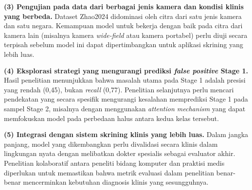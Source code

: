 \textbf{(3) Pengujian pada data dari berbagai jenis kamera dan kondisi klinis yang berbeda.}
Dataset Zhao2024 didominasi oleh citra dari satu jenis kamera dan satu negara. Kemampuan
model untuk bekerja dengan baik pada citra dari kamera lain (misalnya kamera \textit{wide-field} atau
kamera portabel) perlu diuji secara terpisah sebelum model ini dapat dipertimbangkan untuk
aplikasi skrining yang lebih luas.

\textbf{(4) Eksplorasi strategi yang mengurangi prediksi \textit{false positive} Stage 1.} Hasil
penelitian menunjukkan bahwa masalah utama pada Stage 1 adalah presisi yang rendah (0,45),
bukan \textit{recall} (0,77). Penelitian selanjutnya perlu mencari pendekatan yang secara
spesifik mengurangi kesalahan memprediksi Stage 1 pada sampel Stage 2, misalnya dengan
menggunakan \textit{attention mechanism} yang dapat memfokuskan model
pada perbedaan halus antara kedua kelas tersebut.

\textbf{(5) Integrasi dengan sistem skrining klinis yang lebih luas.} Dalam jangka panjang,
model yang dikembangkan perlu divalidasi secara klinis dalam lingkungan nyata dengan melibatkan
dokter spesialis sebagai evaluator akhir. Penelitian kolaboratif antara peneliti bidang komputer dan praktisi medis diperlukan untuk memastikan bahwa metrik evaluasi dalam penelitian
benar-benar mencerminkan kebutuhan diagnosis klinis yang sesungguhnya.
